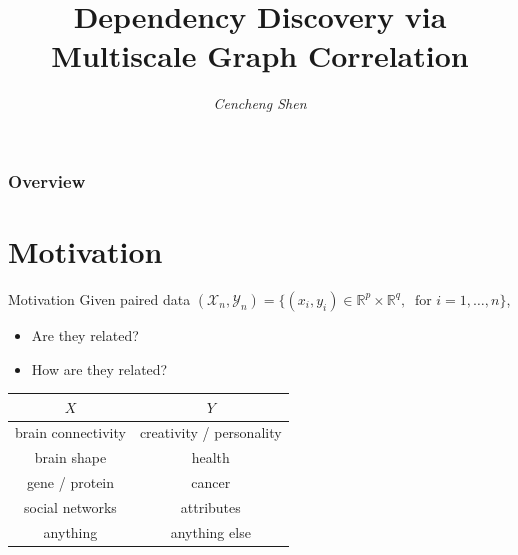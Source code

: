\documentclass[mathserif,t]{beamer}
\title[MGC]{\fontfamily{qtm} \bfseries Dependency Discovery via\\
Multiscale Graph Correlation}
\author[C. Shen]{\large\textcolor{UniTitle}{\textit{Cencheng Shen}}} %
\institute[JHU]{\footnotesize\color{UniTitle}\textit{University of Delaware}\\ %
\bigskip
\bigskip
\bigskip
\bigskip
\textit{Collaborators: Joshua T. Vogelstein, Carey E. Priebe, Shangsi Wang, Youjin Lee, Mauro Maggioni, Qing Wang, Alex Badea.\\
\medskip
Acknowledgment: NSF DMS, DARPA SIMPLEX.\\
\medskip
\medskip
\medskip
R package available in CRAN and \url{https://github.com/neurodata/MGC/}\\
Matlab code available in \url{https://github.com/neurodata/mgc-matlab}}}
\date{\footnotesize\color{UniTitle}\footnotesize\textit{}} %
\newcommand{\Real}{\mathbb{R}}
\newcommand{\Mgc}{MGC}
\begin{document}

\begin{frame}
\titlepage %
\end{frame}

\begin{frame}
\frametitle{Overview} %
\tableofcontents %
\end{frame}

\section{Motivation}
\begin{frame}{Motivation}
Given paired data $(\mathcal{X}_{n},\mathcal{Y}_{n})=\{(x_{i},y_{i}) \in \Real^{p} \times \Real^{q}, \ \mbox{ for } i=1,\ldots,n\}$,
\pause
\begin{itemize}[<+->]
\item Are they related?
\item How are they related?
\end{itemize}
\pause
\medskip

\begin{table}
\centering
\begin{tabular}{|c|c|}
\hline
\textbf{$X$} & \textbf{$Y$}   \\
\hline
brain connectivity  & creativity / personality \\
\hline 
brain shape & health \\
\hline
gene / protein & cancer\\
\hline
social networks & attributes \\
\hline
anything & anything else \\
\hline
\end{tabular}
\end{table}
\end{frame}
\end{document}
